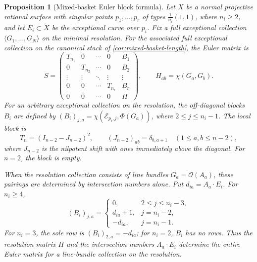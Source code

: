 \documentclass[11pt]{article}
\theoremstyle{plain}
\newtheorem{proposition}[proposition]{Proposition}
\theoremstyle{definition}
\theoremstyle{remark}
\newcommand{\OO}{\mathcal O}
\begin{document}
\begin{proposition}[Mixed-basket Euler block formula]
\label{prop:mixed-basket-euler}
Let \(X\) be a normal projective rational surface with singular points \(p_1,\ldots,p_r\) of
types \(\frac1{n_i}(1,1)\), where \(n_i\geq2\), and let
\(E_i\subset\widetilde X\) be the exceptional curve over \(p_i\).
Fix a full exceptional collection \(\langle G_1,\ldots,G_N\rangle\)
on the minimal resolution. For the associated full exceptional collection on the canonical stack of
\cref{cor:mixed-basket-length}, the Euler matrix is
\[
S=
\begin{pmatrix}
T_{n_1}&0&\cdots&0&B_1\\
0&T_{n_2}&\cdots&0&B_2\\
\vdots&\vdots&\ddots&\vdots&\vdots\\
0&0&\cdots&T_{n_r}&B_r\\
0&0&\cdots&0&H
\end{pmatrix},
\qquad H_{ab}=\chi(G_a,G_b).
\]
For an arbitrary exceptional collection on the resolution, the off-diagonal
blocks \(B_i\) are defined by \((B_i)_{j,a}=\chi(\mathcal E_{p_i,j},\Phi(G_a))\),
where \(2\leq j\leq n_i-1\). The local block is
\begin{equation}\label{eq:Tn}
T_n=(I_{n-2}-J_{n-2})^2,
\qquad (J_{n-2})_{ab}=\delta_{b,a+1}\quad(1\leq a,b\leq n-2),
\end{equation}
where \(J_{n-2}\) is the nilpotent shift with ones immediately above
the diagonal. For \(n=2\), the block is empty.

When the resolution collection consists of line bundles
\(G_a=\OO(A_a)\), these pairings are determined by intersection numbers
alone. Put
\(d_{ia}=A_a\cdot E_i\). For \(n_i\geq4\),
\[
(B_i)_{j,a}=
\begin{cases}
0,&2\leq j\leq n_i-3,\\
d_{ia}+1,&j=n_i-2,\\
-d_{ia},&j=n_i-1.
\end{cases}
\]
For \(n_i=3\), the sole row is \((B_i)_{2,a}=-d_{ia}\); for
\(n_i=2\), \(B_i\) has no rows. Thus the resolution matrix \(H\)
and the intersection numbers \(A_a\cdot E_i\) determine the entire
Euler matrix for a line-bundle collection on the resolution.
\end{proposition}
\end{document}
